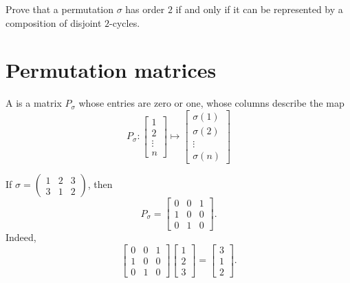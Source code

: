 \documentclass{ximera}
\begin{document}
\begin{exercise}
  Prove that a permutation $\sigma$ has order $2$ if and only if it
  can be represented by a composition of disjoint $2$-cycles.
\end{exercise}



\section{Permutation matrices}

\begin{definition}
  A  is a matrix $P_\sigma$ whose entries are
  zero or one, whose columns describe the map
  \[
  P_\sigma : \begin{bmatrix}
    1 \\
    2 \\
    \vdots \\
    n
  \end{bmatrix}
  \mapsto
  \begin{bmatrix}
    \sigma(1) \\
    \sigma(2) \\
    \vdots \\
    \sigma(n)
  \end{bmatrix}
  \]
\end{definition}



\begin{example}
  If $\sigma =\left(\begin{smallmatrix}
    1 & 2 & 3 \\
    3 & 1 & 2
  \end{smallmatrix}\right)$, then
  \[
  P_\sigma =
  \begin{bmatrix}
    0 & 0 & 1 \\
    1 & 0 & 0 \\
    0  & 1 & 0
  \end{bmatrix}.
  \]
  Indeed,
  \[
  \begin{bmatrix}
    0 & 0 & 1 \\
    1 & 0 & 0 \\
    0  & 1 & 0
  \end{bmatrix}
  \begin{bmatrix}
    1 \\
    2 \\
    3
  \end{bmatrix}
  =
  \begin{bmatrix}
    3 \\
    1 \\
    2
  \end{bmatrix}.
  \]
\end{example}
\end{document}
